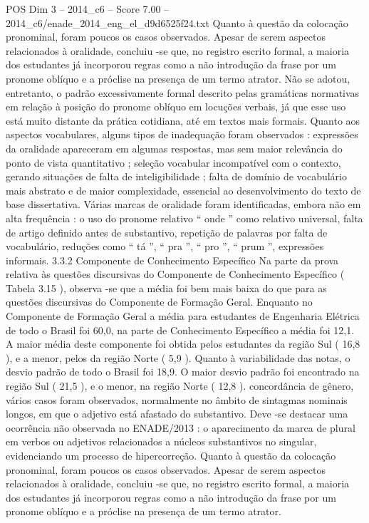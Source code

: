 \begin{textsample}{POS Dim 3 – 2014\_c6 – Score 7.00 – 2014\_c6/enade\_2014\_eng\_el\_d9d6525f24.txt}
Quanto à questão da colocação pronominal, foram poucos os casos observados.
Apesar de serem aspectos relacionados à oralidade, concluiu -se que, no registro escrito formal, a maioria dos estudantes já incorporou regras como a não introdução da frase por um pronome oblíquo e a próclise na presença de um termo atrator.
Não se adotou, entretanto, o padrão excessivamente formal descrito pelas gramáticas normativas em relação à posição do pronome oblíquo em locuções verbais, já que esse uso está muito distante da prática cotidiana, até em textos mais formais.
Quanto aos aspectos vocabulares, alguns tipos de inadequação foram observados : expressões da oralidade apareceram em algumas respostas, mas sem maior relevância do ponto de vista quantitativo ; seleção vocabular incompatível com o contexto, gerando situações de falta de inteligibilidade ; falta de domínio de vocabulário mais abstrato e de maior complexidade, essencial ao desenvolvimento do texto de base dissertativa.
Várias marcas de oralidade foram identificadas, embora não em alta frequência : o uso do pronome relativo “ onde ” como relativo universal, falta de artigo definido antes de substantivo, repetição de palavras por falta de vocabulário, reduções como “ tá ”, “ pra ”, “ pro ”, “ prum ”, expressões informais. 3.3.2 Componente de Conhecimento Específico Na parte da prova relativa às questões discursivas do Componente de Conhecimento Específico ( Tabela 3.15 ), observa -se que a média foi bem mais baixa do que para as questões discursivas do Componente de Formação Geral.
Enquanto no Componente de Formação Geral a média para estudantes de Engenharia Elétrica de todo o Brasil foi 60,0, na parte de Conhecimento Específico a média foi 12,1.
A maior média deste componente foi obtida pelos estudantes da região Sul ( 16,8 ), e a menor, pelos da região Norte ( 5,9 ).
Quanto à variabilidade das notas, o desvio padrão de todo o Brasil foi 18,9.
O maior desvio padrão foi encontrado na região Sul ( 21,5 ), e o menor, na região Norte ( 12,8 ). concordância de gênero, vários casos foram observados, normalmente no âmbito de sintagmas nominais longos, em que o adjetivo está afastado do substantivo.
Deve -se destacar uma ocorrência não observada no ENADE/2013 : o aparecimento da marca de plural em verbos ou adjetivos relacionados a núcleos substantivos no singular, evidenciando um processo de hipercorreção.
Quanto à questão da colocação pronominal, foram poucos os casos observados.
Apesar de serem aspectos relacionados à oralidade, concluiu -se que, no registro escrito formal, a maioria dos estudantes já incorporou regras como a não introdução da frase por um pronome oblíquo e a próclise na presença de um termo atrator.

\end{textsample}
